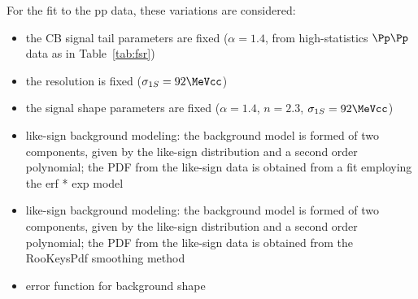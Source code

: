 For the fit to the pp data, these variations are considered:
\begin{itemize}
\item the CB signal tail parameters are fixed ($\alpha=1.4$, from high-statistics $\Pp\Pp$ data as in Table~\ref{tab:fsr})  %
\item the resolution is fixed ($\sigma_{1S}=92\MeVcc$) 
\item the signal shape parameters are fixed ($\alpha=1.4$, $n=2.3$, $\sigma_{1S}=92\MeVcc$) 
\item like-sign background modeling: the background model is formed of two components, given by the like-sign distribution and a second order polynomial; the PDF from the like-sign data is obtained from a fit employing the erf * exp model
\item like-sign background modeling: the background model is formed of two components, given by the like-sign distribution and a second order polynomial; the PDF from the like-sign data is obtained from the RooKeysPdf smoothing method
\item error function for background shape
\end{itemize}
%

